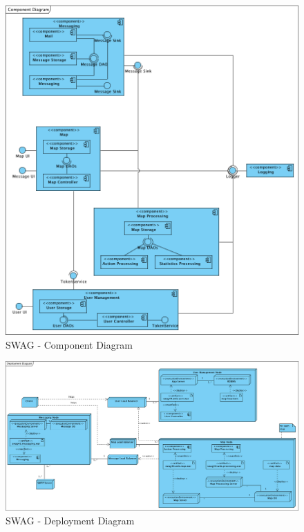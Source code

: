 \documentclass[11pt]{article}
\begin{document}
\begin{figure}[h]
\center
\includegraphics[scale=0.7]{diagrams/component.png}
\caption{SWAG - Component Diagram}
\label{fig:component}
\end{figure}

\begin{figure}[h]
\center
\includegraphics[angle=90, scale=0.6]{diagrams/deployment.png}
\caption{SWAG - Deployment Diagram}
\label{fig:deployment}
\end{figure}

 
\end{document}
